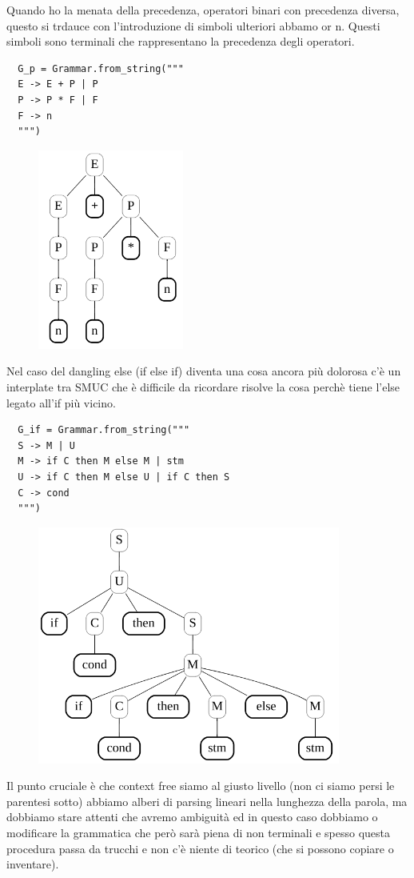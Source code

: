 Quando ho la menata della precedenza, operatori binari con precedenza diversa, questo si trdauce con l'introduzione di simboli ulteriori abbamo or n. Questi simboli sono terminali che rappresentano la precedenza degli operatori.

\begin{lstlisting}
  G_p = Grammar.from_string("""
  E -> E + P | P
  P -> P * F | F
  F -> n
  """)
\end{lstlisting}

\begin{figure}[ht!]
  \centering
  \includegraphics[scale=1]{images/AlberiParsing/precedenza.png}
\end{figure}

Nel caso del dangling else (if else if) diventa una cosa ancora più dolorosa c'è un interplate tra SMUC che è difficile da ricordare risolve la cosa perchè tiene l'else legato all'if più vicino.

\begin{lstlisting}
  G_if = Grammar.from_string("""
  S -> M | U
  M -> if C then M else M | stm
  U -> if C then M else U | if C then S
  C -> cond
  """)
\end{lstlisting}

\begin{figure}[ht!]
  \centering
  \includegraphics[scale=1]{images/AlberiParsing/dandlingElse.png}
\end{figure}

Il punto cruciale è che context free siamo al giusto livello (non ci siamo persi le parentesi sotto) abbiamo alberi di parsing lineari nella lunghezza della parola, ma dobbiamo stare attenti che avremo ambiguità ed in questo caso dobbiamo o modificare la grammatica che però sarà piena di non terminali e spesso questa procedura passa da trucchi e non c'è niente di teorico (che si possono copiare o inventare).
